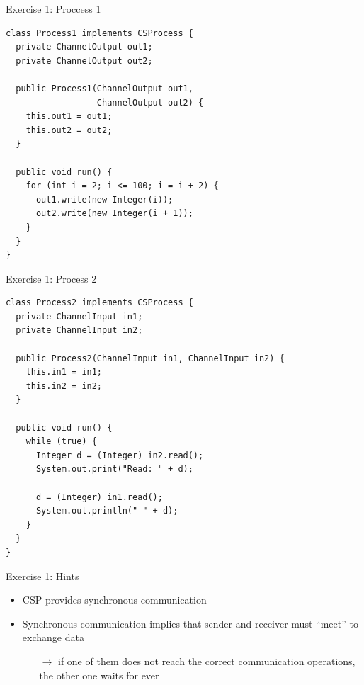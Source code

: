 \begin{frame}[fragile]{Exercise 1: Proccess 1}
\begin{lstlisting}[basicstyle=\fontsize{9}{11}\selectfont\ttfamily]
class Process1 implements CSProcess {
  private ChannelOutput out1;
  private ChannelOutput out2;

  public Process1(ChannelOutput out1, 
                  ChannelOutput out2) {
    this.out1 = out1;
    this.out2 = out2;
  }

  public void run() {
    for (int i = 2; i <= 100; i = i + 2) {
      out1.write(new Integer(i));
      out2.write(new Integer(i + 1));
    }
  }
}
\end{lstlisting}
\end{frame}

\begin{frame}[fragile]{Exercise 1: Process 2}
\begin{lstlisting}[basicstyle=\fontsize{9}{11}\selectfont\ttfamily]
class Process2 implements CSProcess {
  private ChannelInput in1;
  private ChannelInput in2;

  public Process2(ChannelInput in1, ChannelInput in2) {
    this.in1 = in1;
    this.in2 = in2;
  }

  public void run() {
    while (true) {
      Integer d = (Integer) in2.read();
      System.out.print("Read: " + d);

      d = (Integer) in1.read();
      System.out.println(" " + d);
    }
  }
}
\end{lstlisting}
\end{frame}

\begin{frame}{Exercise 1: Hints}
  \begin{itemize}
  \item CSP provides synchronous communication
  \item Synchronous communication implies that sender and receiver
    must ``meet'' to exchange data
    \begin{itemize}
    \item[$\rightarrow$] if one of them does not reach the correct
      communication operations, the other one waits for ever
    \end{itemize}
  \end{itemize}
\end{frame}

